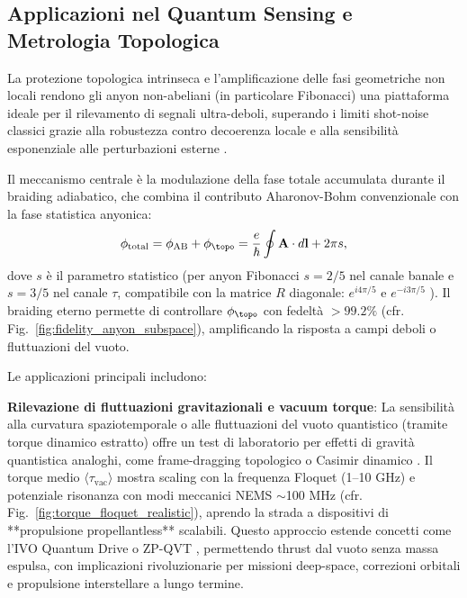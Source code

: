 \documentclass[11pt,a4paper]{article}
\let\oldcite\cite
\renewcommand{\cite}{\protect\oldcite}
\let\oldref\ref
\renewcommand{\ref}{\protect\oldref}
\theoremstyle{plain}
\theoremstyle{definition}
\begin{document}
\vspace{0.3cm}


\subsection{Applicazioni nel Quantum Sensing e Metrologia Topologica}

La protezione topologica intrinseca e l'amplificazione delle fasi geometriche non locali rendono gli anyon non-abeliani (in particolare Fibonacci) una piattaforma ideale per il rilevamento di segnali ultra-deboli, superando i limiti shot-noise classici grazie alla robustezza contro decoerenza locale e alla sensibilità esponenziale alle perturbazioni esterne \cite{levin2006detecting, nayak2008non, xu2024non}.

Il meccanismo centrale è la modulazione della fase totale accumulata durante il braiding adiabatico, che combina il contributo Aharonov-Bohm convenzionale con la fase statistica anyonica:
\begin{equation}
\phi_{\mathrm{total}} = \phi_{\mathrm{AB}} + \phi_{\topo} = \frac{e}{\hbar} \oint \mathbf{A} \cdot d\mathbf{l} + 2\pi s,
\label{eq:total_phase_anyon}
\end{equation}
dove $s$ è il parametro statistico (per anyon Fibonacci $s = 2/5$ nel canale banale e $s = 3/5$ nel canale $\tau$, compatibile con la matrice $R$ diagonale: $e^{i 4\pi/5}$ e $e^{-i 3\pi/5}$ \cite{trebst2009short}). Il braiding eterno permette di controllare $\phi_{\topo}$ con fedeltà $>99.2\%$ (cfr. Fig.~\ref{fig:fidelity_anyon_subspace}), amplificando la risposta a campi deboli o fluttuazioni del vuoto.

\vspace{0.4cm}

Le applicazioni principali includono:

\vspace{0.3cm}

\textbf{Rilevazione di fluttuazioni gravitazionali e vacuum torque}: La sensibilità alla curvatura spaziotemporale o alle fluttuazioni del vuoto quantistico (tramite torque dinamico estratto) offre un test di laboratorio per effetti di gravità quantistica analoghi, come frame-dragging topologico o Casimir dinamico \cite{marachevsky2024casimir, fialkovsky2018quest}. Il torque medio $\langle \tau_{\text{vac}} \rangle$ mostra scaling con la frequenza Floquet (1–10 GHz) e potenziale risonanza con modi meccanici NEMS $\sim$100 MHz (cfr. Fig.~\ref{fig:torque_floquet_realistic}), aprendo la strada a dispositivi di **propulsione propellantless** scalabili. Questo approccio estende concetti come l'IVO Quantum Drive o ZP-QVT \cite{dai2026vacuum}, permettendo thrust dal vuoto senza massa espulsa, con implicazioni rivoluzionarie per missioni deep-space, correzioni orbitali e propulsione interstellare a lungo termine.
\end{document}
